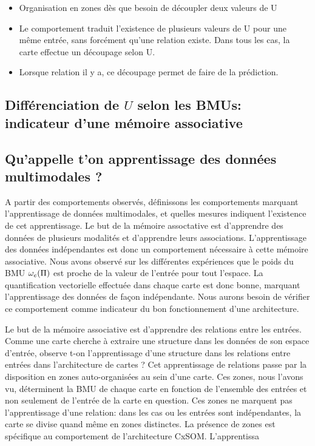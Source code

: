 \begin{itemize}
	\item Organisation en zones dès que besoin de découpler deux valeurs de U
	\item Le comportement traduit l'existence de plusieurs valeurs de U pour une même entrée, sans forcément qu'une relation existe. Dans tous les cas, la carte effectue un découpage selon U.
	\item Lorsque relation il y a, ce découpage permet de faire de la prédiction.
\end{itemize}

\subsection{Différenciation de $U$ selon les BMUs: indicateur d'une mémoire associative}



\subsection{Qu'appelle t'on apprentissage des données multimodales ?}

A partir des comportements observés, définissons les comportements marquant l'apprentissage de données multimodales, et quelles mesures indiquent l'existence de cet apprentissage.
Le but de la mémoire assoctative est d'apprendre des données de plusieurs modalités et d'apprendre leurs associations. L'apprentissage des données indépendantes est donc un comportement nécessaire à cette mémoire associative. 
Nous avons observé sur les différentes expériences que le poids du BMU $\omega_e(\Pi)$ est proche de la valeur de l'entrée pour tout l'espace. La quantification vectorielle effectuée dans chaque carte est donc bonne, marquant l'apprentissage des données de façon indépendante. Nous aurons besoin de vérifier ce comportement comme indicateur du bon fonctionnement d'une architecture.

Le but de la mémoire associative est d'apprendre des relations entre les entrées. Comme une carte cherche à extraire une structure dans les données de son espace d'entrée, observe t-on l'apprentissage d'une structure dans les relations entre entrées dans l'architecture de cartes ? 
Cet apprentissage de relations passe par la disposition en zones auto-organisées au sein d'une carte. Ces zones, nous l'avons vu, déterminent la BMU de chaque carte en fonction de l'ensemble des entrées et non seulement de l'entrée de la carte en question. Ces zones ne marquent pas l'apprentissage d'une relation: dans les cas ou les entrées sont indépendantes, la carte se divise quand même en zones distinctes. La présence de zones est spécifique au comportement de l'architecture CxSOM.
L'apprentissa


